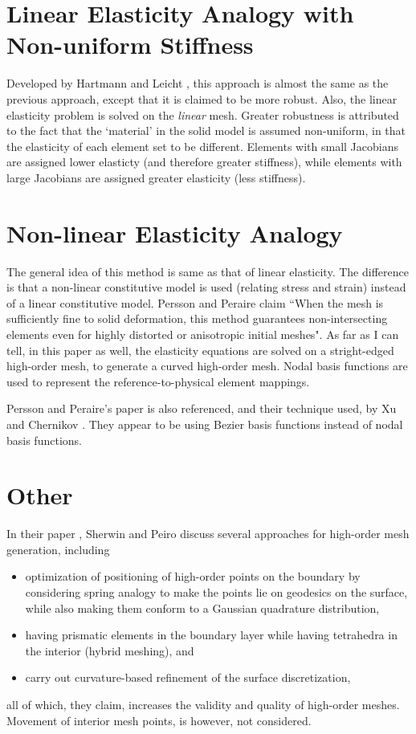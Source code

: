 \documentclass[letterpaper,twoside,11pt]{article}
\begin{document}
\section{Linear Elasticity Analogy with Non-uniform Stiffness}
Developed by Hartmann and Leicht \cite{hartmann}, this approach is almost the same as the previous approach, except that it is claimed to be more robust. Also, the linear elasticity problem is solved on the \emph{linear} mesh. Greater robustness is attributed to the fact that the `material' in the solid model is assumed non-uniform, in that the elasticity of each element set to be different. Elements with small Jacobians are assigned lower elasticty (and therefore greater stiffness), while elements with large Jacobians are assigned greater elasticity (less stiffness).

\section{Non-linear Elasticity Analogy}
The general idea of this method is same as that of linear elasticity. The difference is that a non-linear constitutive model is used (relating stress and strain) instead of a linear constitutive model. Persson and Peraire claim \cite{persson} ``When the mesh is sufficiently fine to solid deformation, this method guarantees non-intersecting elements even for highly distorted or anisotropic initial meshes". As far as I can tell, in this paper as well, the elasticity equations are solved on a stright-edged high-order mesh, to generate a curved high-order mesh. Nodal basis functions are used to represent the reference-to-physical element mappings.

Persson and Peraire's paper is also referenced, and their technique used, by Xu and Chernikov \cite{chernikov}. They appear to be using Bezier basis functions instead of nodal basis functions.

\section{Other}
In their paper \cite{sherwin}, Sherwin and Peiro discuss several approaches for high-order mesh generation, including
\begin{itemize}
\item optimization of positioning of high-order points on the boundary by considering spring analogy to make the points lie on geodesics on the surface, while also making them conform to a Gaussian quadrature distribution,
\item having prismatic elements in the boundary layer while having tetrahedra in the interior (hybrid meshing), and 
\item carry out curvature-based refinement of the surface discretization,
\end{itemize}
all of which, they claim, increases the validity and quality of high-order meshes. Movement of interior mesh points, is however, not considered.
\end{document}
